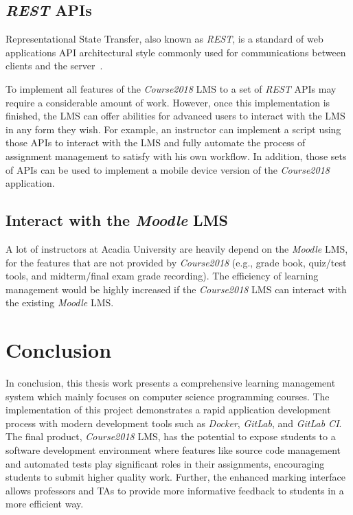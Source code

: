 \subsection{\emph{REST} APIs}
Representational State Transfer, also known as \emph{REST}, is a standard of
web applications API architectural style commonly used for communications
between clients and the server~\citep[Chapter 5]{REST}.

To implement all features of the \emph{Course2018} LMS to a set of \emph{REST} APIs
may require a considerable amount of work. However, once this implementation is
finished, the LMS can offer abilities for advanced users to interact with the
LMS in any form they
wish. For example, an instructor can implement a script using those APIs to
interact with the LMS and fully automate the process of assignment management
to satisfy with his own workflow. In addition, those sets of APIs can be used
to implement a mobile device version of the \emph{Course2018} application.

\subsection{Interact with the \emph{Moodle} LMS}
A lot of instructors at Acadia University are heavily depend on the
\emph{Moodle} LMS, for the features that are not provided by
\emph{Course2018} (e.g., grade book, quiz/test tools, and midterm/final
exam grade recording). The efficiency of learning management would be
highly increased if the \emph{Course2018} LMS can interact with the existing
\emph{Moodle} LMS.


\section{Conclusion}
In conclusion, this thesis work presents a comprehensive
learning management system which mainly focuses on computer science
programming courses. The implementation of this project demonstrates
a rapid application development process with modern development tools
such as \emph{Docker}, \emph{GitLab}, and \emph{GitLab CI}.
The final product, \emph{Course2018} LMS, has the potential to expose
students to a software development environment where features like source
code management and
automated tests play significant roles in their assignments, encouraging
students to submit higher quality work.
Further,
the enhanced marking interface allows professors and TAs to provide more
informative feedback to students in a more efficient way.